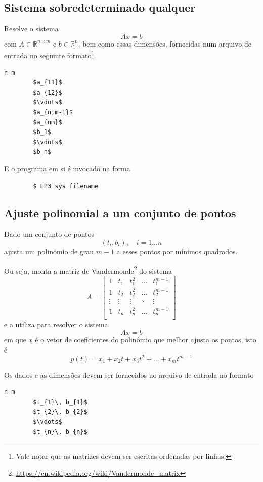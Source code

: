\documentclass[a4paper,11pt]{article}
\begin{document}
        \subsection*{Sistema sobredeterminado qualquer}
            Resolve o sistema
                $$ Ax = b $$
            com $A \in \mathbb{R}^{n\times m}$ e $b \in \mathbb{R}^n$, bem como essas dimensões, fornecidas num arquivo de entrada no seguinte formato\footnote{Vale notar que as matrizes devem ser escritas ordenadas por linhas.}
        \begin{lstlisting}[mathescape, frame=single, caption={Formato do arquivo de entrada com um sistema sobredeterminado}]
        n m
        $a_{11}$
        $a_{12}$
        $\vdots$
        $a_{n,m-1}$
        $a_{nm}$
        $b_1$
        $\vdots$
        $b_n$
        \end{lstlisting}

            E o programa em si é invocado na forma

        \begin{lstlisting}
        $ EP3 sys filename
        \end{lstlisting}


        \subsection*{Ajuste polinomial a um conjunto de pontos}
            Dado um conjunto de pontos
                $$ (t_i, b_i),\quad i = 1\dots n$$
            ajusta um polinômio de grau $m-1$ a esses pontos por mínimos quadrados.

            Ou seja, monta a matriz de Vandermonde\footnote{\url{https://en.wikipedia.org/wiki/Vandermonde_matrix}} do sistema
            $$ A =
            \begin{bmatrix}
                1 & t_1 & t_1^2 & \dots & t_1^{m-1} \\
                1 & t_2 & t_2^2 & \dots & t_2^{m-1} \\
                \vdots & \vdots &\vdots & \ddots & \vdots   \\
                1 & t_n & t_n^2 & \dots & t_n^{m-1} \\
            \end{bmatrix}$$
            e a utiliza para resolver o sistema
            $$ Ax = b$$
            em que $x$ é o vetor de coeficientes do polinômio que melhor ajusta os pontos, isto é
            $$ p(t) = x_1 + x_2t + x_3t^2 + \dots + x_mt^{m-1}$$

            \newpage
            Os dados e as dimensões devem ser fornecidos no arquivo de entrada no formato
        \begin{lstlisting}[mathescape, frame=single, caption={Formato do arquivo de entrada com um conjunto de pontos}]
        n m
        $t_{1}\, b_{1}$
        $t_{2}\, b_{2}$
        $\vdots$
        $t_{n}\, b_{n}$
        \end{lstlisting}
\end{document}

